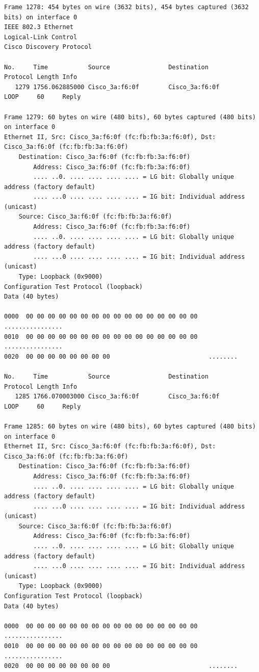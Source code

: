 \documentclass[a4paper,11pt]{article}
\begin{document}
\begin{lstlisting}
Frame 1278: 454 bytes on wire (3632 bits), 454 bytes captured (3632 bits) on interface 0
IEEE 802.3 Ethernet 
Logical-Link Control
Cisco Discovery Protocol

No.     Time           Source                Destination           Protocol Length Info
   1279 1756.062885000 Cisco_3a:f6:0f        Cisco_3a:f6:0f        LOOP     60     Reply

Frame 1279: 60 bytes on wire (480 bits), 60 bytes captured (480 bits) on interface 0
Ethernet II, Src: Cisco_3a:f6:0f (fc:fb:fb:3a:f6:0f), Dst: Cisco_3a:f6:0f (fc:fb:fb:3a:f6:0f)
    Destination: Cisco_3a:f6:0f (fc:fb:fb:3a:f6:0f)
        Address: Cisco_3a:f6:0f (fc:fb:fb:3a:f6:0f)
        .... ..0. .... .... .... .... = LG bit: Globally unique address (factory default)
        .... ...0 .... .... .... .... = IG bit: Individual address (unicast)
    Source: Cisco_3a:f6:0f (fc:fb:fb:3a:f6:0f)
        Address: Cisco_3a:f6:0f (fc:fb:fb:3a:f6:0f)
        .... ..0. .... .... .... .... = LG bit: Globally unique address (factory default)
        .... ...0 .... .... .... .... = IG bit: Individual address (unicast)
    Type: Loopback (0x9000)
Configuration Test Protocol (loopback)
Data (40 bytes)

0000  00 00 00 00 00 00 00 00 00 00 00 00 00 00 00 00   ................
0010  00 00 00 00 00 00 00 00 00 00 00 00 00 00 00 00   ................
0020  00 00 00 00 00 00 00 00                           ........

No.     Time           Source                Destination           Protocol Length Info
   1285 1766.070003000 Cisco_3a:f6:0f        Cisco_3a:f6:0f        LOOP     60     Reply

Frame 1285: 60 bytes on wire (480 bits), 60 bytes captured (480 bits) on interface 0
Ethernet II, Src: Cisco_3a:f6:0f (fc:fb:fb:3a:f6:0f), Dst: Cisco_3a:f6:0f (fc:fb:fb:3a:f6:0f)
    Destination: Cisco_3a:f6:0f (fc:fb:fb:3a:f6:0f)
        Address: Cisco_3a:f6:0f (fc:fb:fb:3a:f6:0f)
        .... ..0. .... .... .... .... = LG bit: Globally unique address (factory default)
        .... ...0 .... .... .... .... = IG bit: Individual address (unicast)
    Source: Cisco_3a:f6:0f (fc:fb:fb:3a:f6:0f)
        Address: Cisco_3a:f6:0f (fc:fb:fb:3a:f6:0f)
        .... ..0. .... .... .... .... = LG bit: Globally unique address (factory default)
        .... ...0 .... .... .... .... = IG bit: Individual address (unicast)
    Type: Loopback (0x9000)
Configuration Test Protocol (loopback)
Data (40 bytes)

0000  00 00 00 00 00 00 00 00 00 00 00 00 00 00 00 00   ................
0010  00 00 00 00 00 00 00 00 00 00 00 00 00 00 00 00   ................
0020  00 00 00 00 00 00 00 00                           ........


\end{lstlisting}
\end{document}
